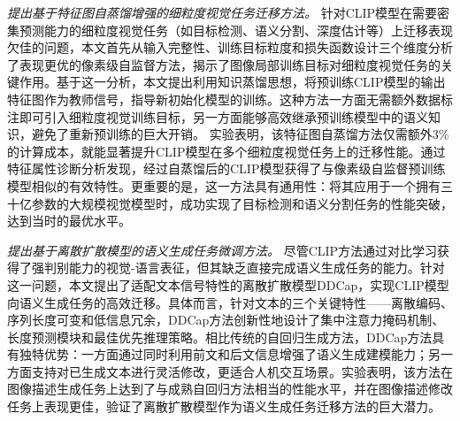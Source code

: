 \textit{提出基于特征图自蒸馏增强的细粒度视觉任务迁移方法。}
针对CLIP模型在需要密集预测能力的细粒度视觉任务（如目标检测、语义分割、深度估计等）上迁移表现欠佳的问题，本文首先从输入完整性、训练目标粒度和损失函数设计三个维度分析了表现更优的像素级自监督方法，揭示了图像局部训练目标对细粒度视觉任务的关键作用。基于这一分析，本文提出利用知识蒸馏思想，将预训练CLIP模型的输出特征图作为教师信号，指导新初始化模型的训练。这种方法一方面无需额外数据标注即可引入细粒度视觉训练目标，另一方面能够高效继承预训练模型中的语义知识，避免了重新预训练的巨大开销。
实验表明，该特征图自蒸馏方法仅需额外3\%的计算成本，就能显著提升CLIP模型在多个细粒度视觉任务上的迁移性能。通过特征属性诊断分析发现，经过自蒸馏后的CLIP模型获得了与像素级自监督预训练模型相似的有效特性。更重要的是，这一方法具有通用性：将其应用于一个拥有三十亿参数的大规模视觉模型时，成功实现了目标检测和语义分割任务的性能突破，达到当时的最优水平。

\textit{提出基于离散扩散模型的语义生成任务微调方法。} %
尽管CLIP方法通过对比学习获得了强判别能力的视觉-语言表征，但其缺乏直接完成语义生成任务的能力。针对这一问题，本文提出了适配文本信号特性的离散扩散模型DDCap，实现CLIP模型向语义生成任务的高效迁移。具体而言，针对文本的三个关键特性——离散编码、序列长度可变和低信息冗余，DDCap方法创新性地设计了集中注意力掩码机制、长度预测模块和最佳优先推理策略。相比传统的自回归生成方法，DDCap方法具有独特优势：一方面通过同时利用前文和后文信息增强了语义生成建模能力；另一方面支持对已生成文本进行灵活修改，更适合人机交互场景。实验表明，该方法在图像描述生成任务上达到了与成熟自回归方法相当的性能水平，并在图像描述修改任务上表现更佳，验证了离散扩散模型作为语义生成任务迁移方法的巨大潜力。


